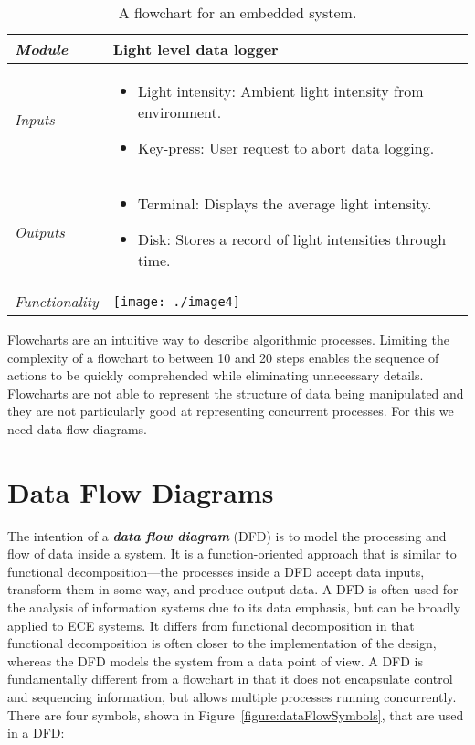 \begin{table}[h]
\caption{A flowchart for an embedded system.}
\label{table:flowchartEmbedded}
\begin{tabular}{|l|m{10cm}|}
\hline

\emph{Module} & Light level data logger \\ \hline
\emph{Inputs} & 
\begin{itemize}
\item
  Light intensity: Ambient light intensity from environment.
\item
  Key-press: User request to abort data logging.
\end{itemize}\\ \hline

\emph{Outputs} & 
\begin{itemize}
\item
  Terminal: Displays the average light intensity.
\item
  Disk: Stores a record of light intensities through time.
\end{itemize} \\ \hline
\emph{Functionality} &
\texttt{[image: ./image4]} \\ \hline
\end{tabular}
\end{table}


Flowcharts are an intuitive way to describe algorithmic processes.
Limiting the complexity of a flowchart to between 10 and 20 steps
enables the sequence of actions to be quickly comprehended while
eliminating unnecessary details. Flowcharts are not able to represent
the structure of data being manipulated and they are not particularly
good at representing concurrent processes. For this we need data flow
diagrams.

\section{Data Flow Diagrams}
\label{section:data-flow-diagrams}

The intention of a \emph{\textbf{data flow diagram}} (DFD) is to model
the processing and flow of data inside a system. It is a
function-oriented approach that is similar to functional
decomposition---the processes inside a DFD accept data inputs, transform
them in some way, and produce output data. A DFD is often used for the
analysis of information systems due to its data emphasis, but can be
broadly applied to ECE systems. It differs from functional decomposition
in that functional decomposition is often closer to the implementation
of the design, whereas the DFD models the system from a data point of
view. A DFD is fundamentally different from a flowchart in that it does
not encapsulate control and sequencing information, but allows multiple
processes running concurrently. There are four symbols, shown in 
Figure~\ref{figure:dataFlowSymbols}, that are used in a DFD:

